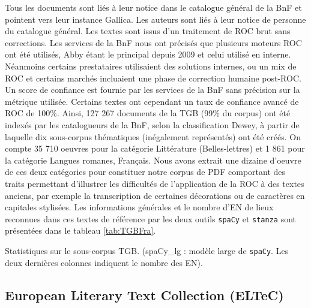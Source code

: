 Tous les documents sont liés à leur notice dans le catalogue général de la BnF et pointent vers leur instance Gallica. Les auteurs sont liés à leur notice de personne du catalogue général. Les textes sont issus d’un traitement de ROC brut sans corrections. Les services de la BnF nous ont précisés que plusieurs moteurs ROC ont été utilisés, Abby étant le principal depuis 2009 et celui utilisé en interne. Néanmoins certains prestataires utilisaient des solutions internes, ou un mix de ROC et certains marchés incluaient une phase de correction humaine post-ROC.
Un score de confiance est fournie par les services de la BnF sans précision sur la métrique utilisée. Certains textes ont cependant un taux de confiance avancé de ROC de 100\%. Ainsi, 127 267 documents de la TGB (99\% du corpus) ont été indexés par les catalogueurs de la BnF, selon la classification Dewey, à partir de laquelle dix sous-corpus thématiques (inégalement représentés) ont été créés. %
On compte 35 710 oeuvres pour la catégorie Littérature (Belles-lettres) et 1 861 pour la catégorie Langues romanes, Français. Nous avons extrait une dizaine d'oeuvre de ces deux catégories pour constituer notre corpus de PDF comportant des traits permettant d'illustrer les difficultés de l'application de la ROC à des textes anciens, par exemple la transcription de certaines décorations ou de caractères en capitales stylisées. Les informations générales et le nombre d'EN de lieux reconnues dans ces textes de référence par les deux outils \texttt{spaCy} et \texttt{stanza} sont présentées dans le tableau \ref{tab:TGBFra}. 


\begin{table}[h!]
    \centering
    \small
    
    \caption{Statistiques sur le sous-corpus TGB. (spaCy\_lg : modèle large de \texttt{spaCy}. Les deux dernières colonnes indiquent le nombre des EN).}
    \label{tab:TGBFra}
\end{table}



\subsection{European Literary Text Collection (ELTeC)}

